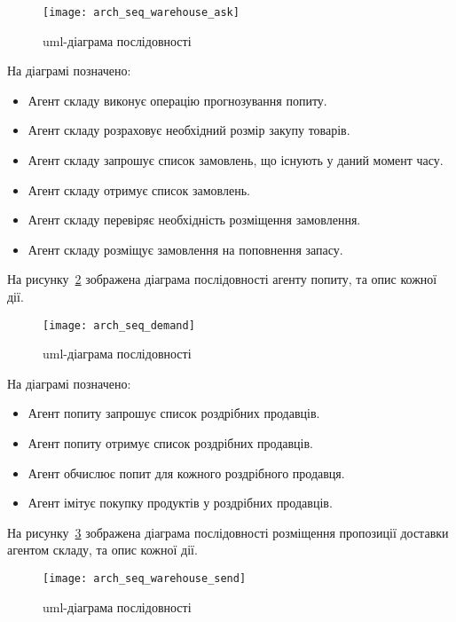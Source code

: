 \begin{figure}[H]
	\centering
	\texttt{[image: arch\_seq\_warehouse\_ask]}
	\caption{\acrshort{uml}-діаграма послідовності}
	\label{fig:arch_seq_warehouse_ask}
\end{figure} 

На діаграмі позначено:
\begin{itemize}
	\item Агент складу виконує операцію прогнозування попиту.
	\item Агент складу розраховує необхідний розмір закупу товарів.
	\item Агент складу запрошує список замовлень, що існують у даний момент часу.
	\item Агент складу отримує список замовлень.
	\item Агент складу перевіряє необхідність розміщення замовлення. 
	\item Агент складу розміщує замовлення на поповнення запасу.
\end{itemize}

На рисунку~\ref{fig:arch_seq_demand} зображена діаграма послідовності агенту попиту, та опис кожної дії.

\begin{figure}[H]
	\centering
	\texttt{[image: arch\_seq\_demand]}
	\caption{\acrshort{uml}-діаграма послідовності}
	\label{fig:arch_seq_demand}
\end{figure} 

На діаграмі позначено:
\begin{itemize}
	\item Агент попиту запрошує список роздрібних продавців.
	\item Агент попиту отримує список роздрібних продавців.
	\item Агент обчислює попит для кожного роздрібного продавця.
	\item Агент імітує покупку продуктів у роздрібних продавців.
\end{itemize}

На рисунку~\ref{fig:arch_seq_warehouse_send} зображена діаграма послідовності розміщення пропозиції доставки агентом складу, та опис кожної дії.

\begin{figure}[H]
	\centering
	\texttt{[image: arch\_seq\_warehouse\_send]}
	\caption{\acrshort{uml}-діаграма послідовності}
	\label{fig:arch_seq_warehouse_send}
\end{figure} 

